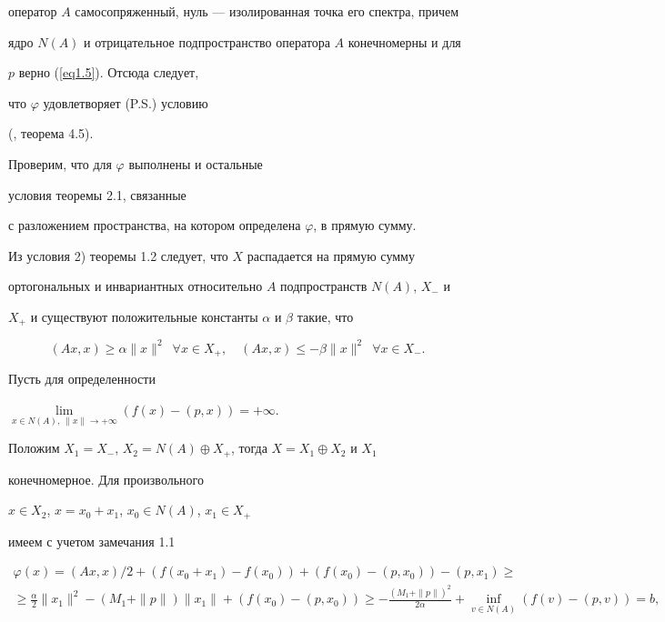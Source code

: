 оператор $A$ самосопряженный, нуль --- изолированная точка его спектра, причем


ядро $N(A)$ и отрицательное подпространство оператора $A$ конечномерны и для


$p$ верно (\ref{eq1.5}). Отсюда следует,


что $\varphi$ удовлетворяет (P.S.) условию


(\cite{n9}, теорема 4.5).





Проверим, что для $\varphi$ выполнены и остальные


условия теоремы 2.1, связанные


с разложением пространства, на котором определена $\varphi$, в прямую сумму.





Из условия 2) теоремы 1.2 следует, что $X$ распадается на прямую сумму


ортогональных и инвариантных относительно $A$ подпространств $N(A)$, $X_-$ и


$X_+$ и существуют положительные константы $\alpha$ и $\beta$ такие, что


$$


(Ax,x)\ge\alpha\| x\| ^2\ \; \forall x\in X_+,\quad (Ax,x)\le-\beta\| x\|^2


\ \;\forall x\in X_-.


$$


Пусть для определенности


$\lim\limits_{x\in N(A),\ \| x\|\to +\infty} (f(x)-(p,x))= +\infty$.


Положим $X_1=X_-$, $X_2=N(A)\oplus X_+$, тогда $ X=X_1\oplus X_2$ и $X_1$


конечномерное. Для произвольного


$x\in X_2$, $x=x_0+x_1$, $x_0\in N(A)$, $x_1\in X_+$


имеем с учетом замечания 1.1


\begin{multline*}


\varphi (x)=(Ax,x)/2+(f(x_0+x_1)-f(x_0))+(f(x_0)-(p,x_0))-(p,x_1)\ge \\


\ge\frac{\alpha}{2}\| x_1\| ^2-(M_1+\| p\|)\| x_1\| +(f(x_0)-(p,x_0))\ge -


\frac{(M_1+\| p\|)^2}{2\alpha}+


\inf\limits_{v\in N(A)} (f(v)-(p,v))=b,


\end{multline*}


